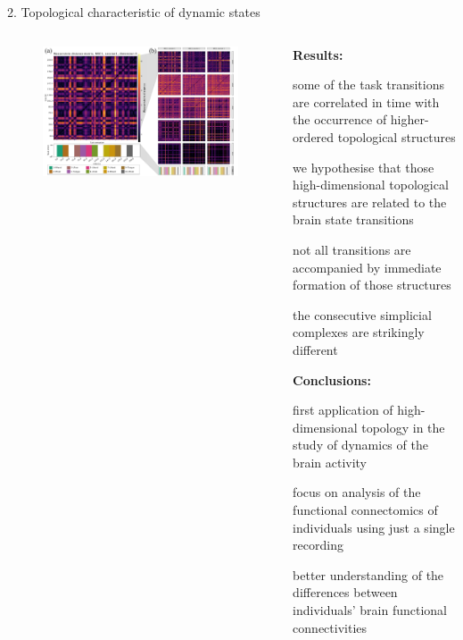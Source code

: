 \documentclass[final]{beamer}
\begin{document}
\begin{frame}{}
\begin{block}{2. Topological characteristic of dynamic states}
\begin{columns}
{\begin{column}{0.5\textwidth}
            \begin{figure}[H]
            \centering
              \includegraphics[width=\linewidth]{images/2-wmat.pdf}
            \label{fig:preproc}
            \end{figure}
        \end{column}
        \begin{column}{0.48\textwidth}
        
            \textbf{Results:}
            \begin{itemize}
            \small{
                \item some of the task transitions are correlated in time with the occurrence of higher-ordered topological structures
                \item we hypothesise that those high-dimensional topological structures are related to the brain state transitions
                \item  not all transitions are accompanied by immediate formation of those structures 
                \item the consecutive simplicial complexes are strikingly different
            }
            \end{itemize}
            \;
            
            \;
            
            \textbf{Conclusions:}
            \begin{itemize}
            \small{
                \item first application of high-dimensional topology in the study of dynamics of the brain activity
                \item focus on analysis of the functional connectomics of individuals using just a single recording
                \item better understanding of the differences between individuals’ brain functional connectivities
            }
            \end{itemize}
        \end{column}
            
}
\end{columns}
\end{block}
\end{frame}
\end{document}
